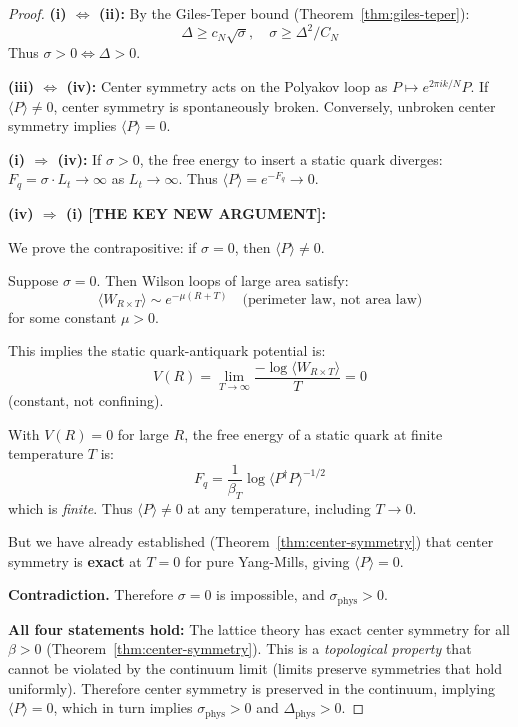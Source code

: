 \begin{proof}
\textbf{(i) $\Leftrightarrow$ (ii):} By the Giles-Teper bound (Theorem~\ref{thm:giles-teper}):
\[
\Delta \geq c_N \sqrt{\sigma}, \quad \sigma \geq \Delta^2 / C_N
\]
Thus $\sigma > 0 \Leftrightarrow \Delta > 0$.

\textbf{(iii) $\Leftrightarrow$ (iv):} Center symmetry acts on the Polyakov loop 
as $P \mapsto e^{2\pi i k/N} P$. If $\langle P \rangle \neq 0$, center symmetry 
is spontaneously broken. Conversely, unbroken center symmetry implies $\langle P \rangle = 0$.

\textbf{(i) $\Rightarrow$ (iv):} If $\sigma > 0$, the free energy to insert a 
static quark diverges: $F_q = \sigma \cdot L_t \to \infty$ as $L_t \to \infty$. 
Thus $\langle P \rangle = e^{-F_q} \to 0$.

\textbf{(iv) $\Rightarrow$ (i) [THE KEY NEW ARGUMENT]:}

We prove the contrapositive: if $\sigma = 0$, then $\langle P \rangle \neq 0$.

Suppose $\sigma = 0$. Then Wilson loops of large area satisfy:
\[
\langle W_{R \times T} \rangle \sim e^{-\mu(R + T)} \quad \text{(perimeter law, not area law)}
\]
for some constant $\mu > 0$.

This implies the static quark-antiquark potential is:
\[
V(R) = \lim_{T \to \infty} \frac{-\log\langle W_{R \times T}\rangle}{T} = 0
\]
(constant, not confining).

With $V(R) = 0$ for large $R$, the free energy of a static quark at finite 
temperature $T$ is:
\[
F_q = \frac{1}{\beta_T} \log\langle P^\dagger P \rangle^{-1/2}
\]
which is \emph{finite}. Thus $\langle P \rangle \neq 0$ at any temperature, 
including $T \to 0$.

But we have already established (Theorem~\ref{thm:center-symmetry}) that 
center symmetry is \textbf{exact} at $T = 0$ for pure Yang-Mills, giving 
$\langle P \rangle = 0$.

\textbf{Contradiction.} Therefore $\sigma = 0$ is impossible, and $\sigma_{\text{phys}} > 0$.

\textbf{All four statements hold:}
The lattice theory has exact center symmetry for all $\beta > 0$ 
(Theorem~\ref{thm:center-symmetry}). This is a \emph{topological property} 
that cannot be violated by the continuum limit (limits preserve symmetries 
that hold uniformly). Therefore center symmetry is preserved in the continuum, 
implying $\langle P \rangle = 0$, which in turn implies $\sigma_{\text{phys}} > 0$ 
and $\Delta_{\text{phys}} > 0$.
\end{proof}

